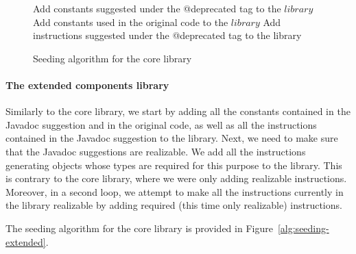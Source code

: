 \documentclass[runningheads,a4paper]{llncs}
\begin{document}

\begin{figure}
\begin{algorithm}[H]
\SetAlgoLined
{}
 Add constants suggested under the @deprecated tag to the $library$\;
 Add constants used in the original code to the $library$\;
 Add instructions suggested under the @deprecated tag to the library\;
\end{algorithm}
 \caption{Seeding algorithm for the core library}
\label{alg:seeding-core}
\end{figure}

\paragraph{The extended components library}
Similarly to the core library, we start by adding all the constants contained in the Javadoc suggestion
and in the original code, as well as all the instructions contained
in the Javadoc suggestion to the library. Next, we need to make sure that the Javadoc suggestions
are realizable. We add all the instructions generating
objects whose types are required for this purpose to the library.
This is contrary to the core library, where we were only adding realizable instructions.
Moreover, in a second  loop, we attempt to make all the instructions currently in
the library realizable by adding required (this time only realizable) instructions.

The seeding algorithm for the core library is provided in Figure~\ref{alg:seeding-extended}.
\end{document}
